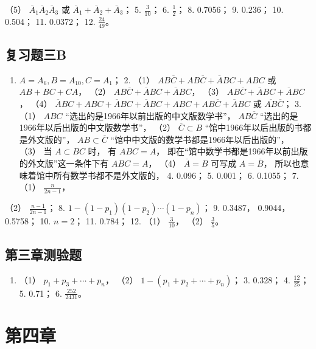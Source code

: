 （5） \(\overline{A}_1\overline{A}_2\overline{A}_3\) 或
\(\overline{A}_1 + \overline{A}_2 + \overline{A}_3\)； 5.
\(\frac{3}{10}\)； 6. \(\frac{1}{2}\)； 8. 0.7056； 9. 0.236； 10.
0.504； 11. 0.0372； 12. \(\frac{24}{49}\)。

\subsection{复习题三B}

\begin{enumerate}
\item
  \(A = A_{6}, B = A_{10}, C = A_{1}\)； 2. （1）
  \(AB\overline{C} + AB\overline{C} + \overline{A}BC + ABC\) 或
  \(AB + BC + CA\)， （2）
  \(AB\overline{C} + \overline{A}BC + \overline{A}BC\)， （3）
  \(AB\overline{C} + \overline{A}BC + \overline{A}BC\)， （4）
  \(\overline{A}BC + ABC + \overline{A}BC + \overline{A}BC + ABC + AB\overline{C} + \overline{A}BC\)
  或 \(\overline{AB}\overline{C}\)； 3. （1） \(ABC\)
  ``选出的是1966年以前出版的中文版数学书''， \(AB\overline{C}\)
  ``选出的是1966年以后出版的中文版数学书''， （2）
  \(\overline{C} \subset B\) ``馆中1966年以后出版的书都是外文版的''，
  \(AB \subset \overline{C}\)
  ``馆中中文版的数学书都是1966年以后出版的''， （3） 当 \(A \subset BC\)
  时， 有 \(ABC = A\)，
  即在``馆中数学书都是1966年以前出版的外文版''这一条件下有 \(ABC = A\)，
  （4） \(\overline{A} = B\) 可写成 \(A = \overline{B}\)，
  所以也意味着馆中所有数学书都不是外文版的， 4. 0.096； 5. 0.001； 6.
  0.1055； 7. （1） \(\frac{n}{2n - 1}\)，
\end{enumerate}

（2） \(\frac{n - 1}{2n - 1}\)； 8.
\(1 - (1 - p_1)(1 - p_2) \cdots (1 - p_n)\)； 9. 0.3487， 0.9044，
0.5758； 10. \(n = 2\)； 11. 0.784； 12. （1） \(\frac{3}{10}\)， （2）
\(\frac{3}{5}\)。

\subsection{第三章测验题}

\begin{enumerate}[start=2]
\item
  （1） \(p_1 + p_3 + \cdots + p_n\)， （2）
  \(1 - (p_1 + p_2 + \cdots + p_n)\)； 3. 0.328； 4. \(\frac{12}{25}\)；
  5. 0.71； 6. \(\frac{252}{2431}\)。
\end{enumerate}

\section{第四章}

